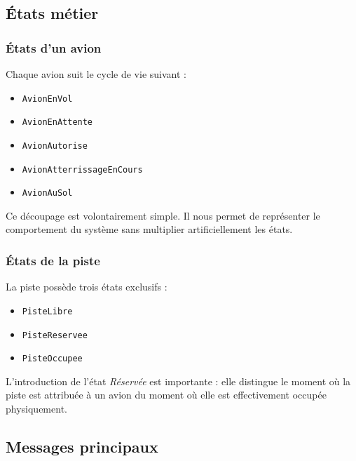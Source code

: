\documentclass[11pt,a4paper]{article}
\begin{document}
\subsection{États métier}

\subsubsection{États d'un avion}

Chaque avion suit le cycle de vie suivant :
\begin{itemize}
    \item \texttt{AvionEnVol}
    \item \texttt{AvionEnAttente}
    \item \texttt{AvionAutorise}
    \item \texttt{AvionAtterrissageEnCours}
    \item \texttt{AvionAuSol}
\end{itemize}

Ce découpage est volontairement simple. Il nous permet de représenter le comportement du système sans multiplier artificiellement les états.

\subsubsection{États de la piste}

La piste possède trois états exclusifs :
\begin{itemize}
    \item \texttt{PisteLibre}
    \item \texttt{PisteReservee}
    \item \texttt{PisteOccupee}
\end{itemize}

L'introduction de l'état \emph{Réservée} est importante : elle distingue le moment où la piste est attribuée à un avion du moment où elle est effectivement occupée physiquement.

\subsection{Messages principaux}
\end{document}
